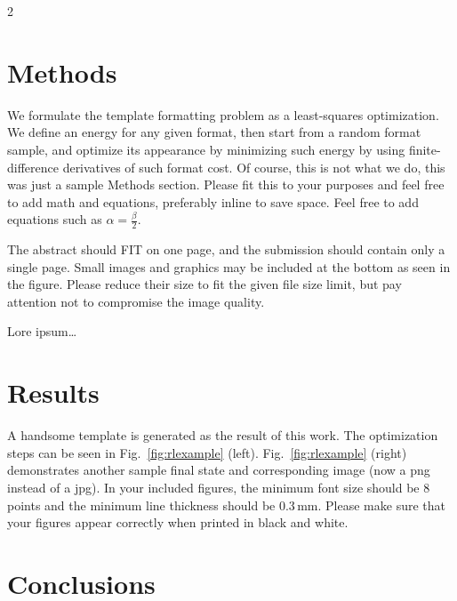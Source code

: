 \documentclass[paper=letter,fontsize=11pt]{scrartcl}	 %
\begin{document}
\begin{multicols}{2}
\section*{Methods}

We formulate the template formatting problem as a least-squares optimization.  
We define an energy for any given format, then start from a random format sample, and optimize its appearance by minimizing such energy by using finite-difference derivatives of such format cost.  
Of course, this is not what we do, this was just a sample Methods section.  
Please fit this to your purposes and feel free to add math and equations, preferably inline to save space.
Feel free to add equations such as $\alpha = \frac{\beta}{2}$.

The abstract should FIT on one page, and the submission should contain only a single page. 
Small images and graphics may be included at the bottom as seen in the figure.
Please reduce their size to%
fit the given file size limit, but pay attention not to compromise the image quality.

Lore ipsum\ldots \lipsum[12] %


\section*{Results}

A handsome template is generated as the result of this work. The optimization steps can be seen in Fig.~\ref{fig:rlexample} (left). Fig.~\ref{fig:rlexample} (right) demonstrates another sample final state and corresponding image (now a png instead of a jpg). In your included figures, the minimum font size should be 8 points and the minimum line thickness should be 0.3\,mm.
Please make sure that your figures appear correctly when printed in black and white.

\section*{Conclusions}


\end{multicols}
\end{document}
